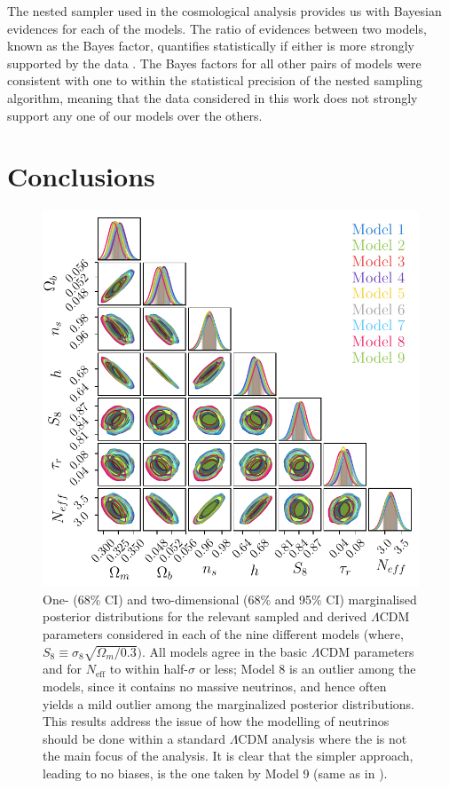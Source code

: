 \qquad The nested sampler used in the cosmological analysis provides us with Bayesian evidences for each of the models. The ratio of evidences between two models, known as the Bayes factor, quantifies statistically if either is more strongly supported by the data \citep{1995BayesFactor}. The Bayes factors for all other pairs of models were consistent with one to within the statistical precision of the nested sampling algorithm, meaning that the data considered in this work does not strongly support any one of our models over the others.

\section{Conclusions}
\begin{figure}
\begin{center}
\includegraphics[width=\columnwidth]{Neutrino-FIGS/LCDM_Params_prl_alt.pdf}
\caption[One- (68\% CI) and two-dimensional (68\% and 95\% CI) marginalised posterior distributions for the relevant sampled and derived $\Lambda$CDM parameters in each of the nine different models.]{One- (68\% CI) and two-dimensional (68\% and 95\% CI) marginalised posterior distributions for the relevant sampled and derived $\Lambda$CDM parameters considered in each of the nine different models (where, $S_8 \equiv \sigma_8\sqrt{\Omega_m/0.3})$. All models agree in the basic $\Lambda$CDM parameters and for $N_{\text{eff}}$ to within half-$\sigma$ or less; Model 8 is an outlier among the models, since it contains no massive neutrinos, and hence often yields a mild outlier among the marginalized posterior distributions. This results address the issue of how the modelling of neutrinos should be done within a standard $\Lambda$CDM analysis where the \NM{} is not the main focus of the analysis. It is clear that the simpler approach, leading to no biases, is the one taken by Model 9 (same as in \cite{PlanckCosmology2016,2018PlanckCosmology}).}
\label{fig:LCDM}
\end{center}
\end{figure}



